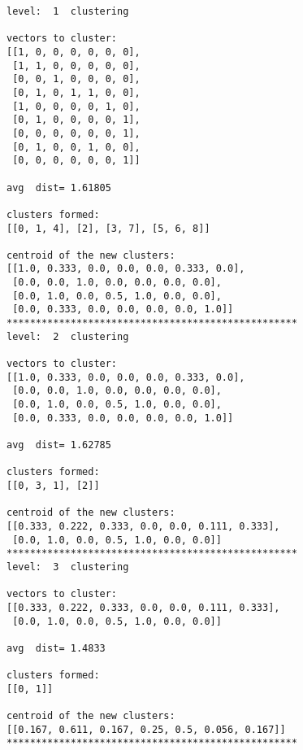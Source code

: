 \documentclass[11pt]{article}
\begin{document}
    \begin{Verbatim}[commandchars=\\\{\}]
level:  1  clustering

vectors to cluster:
[[1, 0, 0, 0, 0, 0, 0],
 [1, 1, 0, 0, 0, 0, 0],
 [0, 0, 1, 0, 0, 0, 0],
 [0, 1, 0, 1, 1, 0, 0],
 [1, 0, 0, 0, 0, 1, 0],
 [0, 1, 0, 0, 0, 0, 1],
 [0, 0, 0, 0, 0, 0, 1],
 [0, 1, 0, 0, 1, 0, 0],
 [0, 0, 0, 0, 0, 0, 1]]

avg  dist= 1.61805

clusters formed:
[[0, 1, 4], [2], [3, 7], [5, 6, 8]]

centroid of the new clusters:
[[1.0, 0.333, 0.0, 0.0, 0.0, 0.333, 0.0],
 [0.0, 0.0, 1.0, 0.0, 0.0, 0.0, 0.0],
 [0.0, 1.0, 0.0, 0.5, 1.0, 0.0, 0.0],
 [0.0, 0.333, 0.0, 0.0, 0.0, 0.0, 1.0]]
**************************************************
level:  2  clustering

vectors to cluster:
[[1.0, 0.333, 0.0, 0.0, 0.0, 0.333, 0.0],
 [0.0, 0.0, 1.0, 0.0, 0.0, 0.0, 0.0],
 [0.0, 1.0, 0.0, 0.5, 1.0, 0.0, 0.0],
 [0.0, 0.333, 0.0, 0.0, 0.0, 0.0, 1.0]]

avg  dist= 1.62785

clusters formed:
[[0, 3, 1], [2]]

centroid of the new clusters:
[[0.333, 0.222, 0.333, 0.0, 0.0, 0.111, 0.333],
 [0.0, 1.0, 0.0, 0.5, 1.0, 0.0, 0.0]]
**************************************************
level:  3  clustering

vectors to cluster:
[[0.333, 0.222, 0.333, 0.0, 0.0, 0.111, 0.333],
 [0.0, 1.0, 0.0, 0.5, 1.0, 0.0, 0.0]]

avg  dist= 1.4833

clusters formed:
[[0, 1]]

centroid of the new clusters:
[[0.167, 0.611, 0.167, 0.25, 0.5, 0.056, 0.167]]
**************************************************

    \end{Verbatim}
\end{document}
